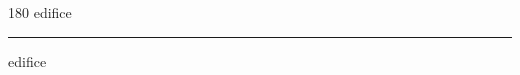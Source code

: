 
\begin{frame}
\begin{center}
\begin{turn}{180}
{\fontsize{2.5cm}{1em}\selectfont edifice}
\end{turn}
\vspace{1em}\par  
\hrule
\vspace{1em}\par  
{\fontsize{2.5cm}{1em}\selectfont edifice}
\end{center}
\end{frame}
